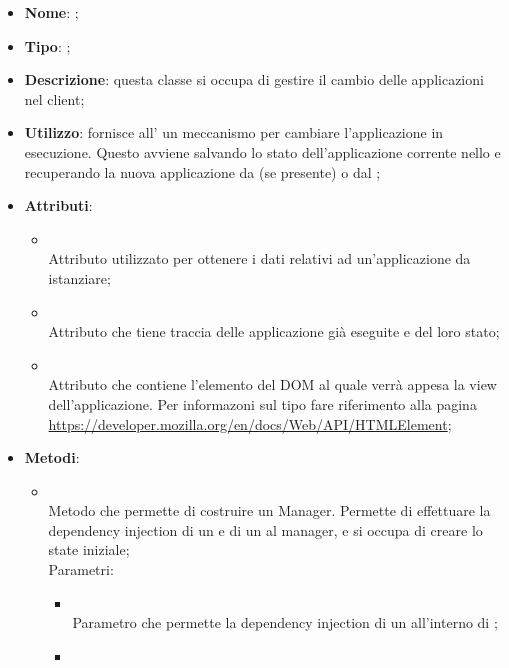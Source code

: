 \begin{itemize}
	\item \textbf{Nome}: ;
	\item \textbf{Tipo}: ;
	\item \textbf{Descrizione}: questa classe si occupa di gestire il cambio delle applicazioni nel client;
	\item \textbf{Utilizzo}: fornisce all' un meccanismo per cambiare l'applicazione in esecuzione. Questo avviene salvando lo stato dell'applicazione corrente nello  e recuperando la nuova applicazione da  (se presente) o dal ;
	\item \textbf{Attributi}:
	\begin{itemize}
		\item[]  \\
		Attributo utilizzato per ottenere i dati relativi ad un'applicazione da istanziare;
		\item[]  \\
		Attributo che tiene traccia delle applicazione già eseguite e del loro stato;
		\item[]  \\
		Attributo che contiene l'elemento del DOM al quale verrà appesa la view dell'applicazione. Per informazoni sul tipo  fare riferimento alla pagina \url{https://developer.mozilla.org/en/docs/Web/API/HTMLElement};
	\end{itemize}
	\item \textbf{Metodi}:
	\begin{itemize}
		\item[]  \\
		Metodo che permette di costruire un Manager. Permette di effettuare la dependency injection di un  e di un  al manager, e si occupa di creare lo state iniziale;\\
		Parametri:
		\begin{itemize}
			\item {} \\
			Parametro che permette la dependency injection di un  all'interno di ;
			\item {} \\

\end{itemize}
\end{itemize}
\end{itemize}
